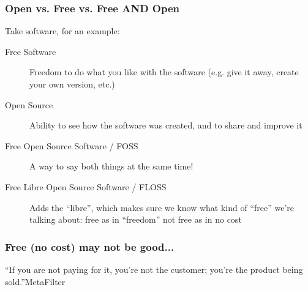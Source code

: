 \documentclass{beamer}
\begin{document}
\begin{frame}
\begin{overlayarea}{\textwidth}{\textheight}
\begin{center}
    \end{center}
  \end{overlayarea}
\end{frame}

\begin{frame}
  \frametitle{Open vs. Free vs. Free AND Open}

  Take software, for an example: 

  \begin{description}
  \item[Free Software] Freedom to do what you like with the software (e.g. give it away, create your own version, etc.)
  \item[Open Source] Ability to see how the software was created, and to share and improve it
  \item[Free Open Source Software / FOSS] A way to say both things at the same time!
  \item[Free Libre Open Source Software / FLOSS] Adds the ``libre'', which makes sure we know what kind of ``free'' we're talking about: free as in ``freedom'' not free as in no cost
  \end{description}
\end{frame}

\begin{frame}
  \frametitle{Free (no cost) may not be good...}
  \begin{LARGE}
    ``If you are not paying for it, you’re not the customer; you’re the product being sold.''\textemdash MetaFilter
  \end{LARGE}
\end{frame}
\end{document}
